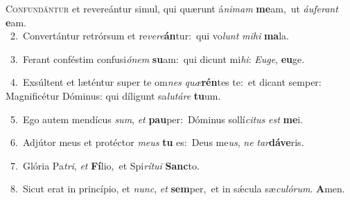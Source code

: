 \lettrine{\initial\textcolor{\initialcolor}{C}}{onfundántur} et revereántur simul, qui quærunt á\-\textit{ni}\-\textit{mam} \textbf{me}\-am,~\star ut \textit{áu}\-\textit{fe}\textit{rant} \textbf{e}\-am.\\
{\numbfont\textcolor{\numbcolor}{~2.}}~Convertántur retrórsum et re\-\textit{ve}\-\textit{re}\textbf{án}tur:~\star qui vo\textit{lunt} \textit{mi}\-\textit{hi} \textbf{ma}\-la.\par
{\numbfont\textcolor{\numbcolor}{~3.}}~Ferant conféstim confusi\-\textit{ó}\-\textit{nem} \textbf{su}\-am:~\star qui dicunt mi\-\textit{hi}\-: \textit{Eu}\-\textit{ge}, \textbf{eu}\-ge.\par
{\numbfont\textcolor{\numbcolor}{~4.}}~Exsúltent et læténtur super te om\textit{nes} \textit{quæ}\-\textbf{rén}tes te:~\star et dicant semper: Magnificétur Dóminus: qui díligunt sa\-\textit{lu}\-\textit{tá}\textit{re} \textbf{tu}\-um.\par
{\numbfont\textcolor{\numbcolor}{~5.}}~Ego autem mendícus \textit{sum}\-, \textit{et} \textbf{pau}\-per:~\star Dóminus sollí\-\textit{ci}\-\textit{tus} \textit{est} \textbf{me}\-i.\par
{\numbfont\textcolor{\numbcolor}{~6.}}~Adjútor meus et protéctor \textit{me}\-\textit{us} \textbf{tu} es:~\star Deus me\-\textit{us}\-, \textit{ne} \textit{tar}\-\textbf{dá}\textbf{ve}ris.\par
{\numbfont\textcolor{\numbcolor}{~7.}}~Glória Pa\-\textit{tri}\-, \textit{et} \textbf{Fí}\-lio,~\star et Spi\-\textit{rí}\-\textit{tu}\textit{i} \textbf{Sanc}\-to.\par
{\numbfont\textcolor{\numbcolor}{~8.}}~Sicut erat in princípio, et \textit{nunc}\-, \textit{et} \textbf{sem}\-per,~\star et in sǽcula sæ\-\textit{cu}\-\textit{ló}\textit{rum}. \textbf{A}\-men.\par
